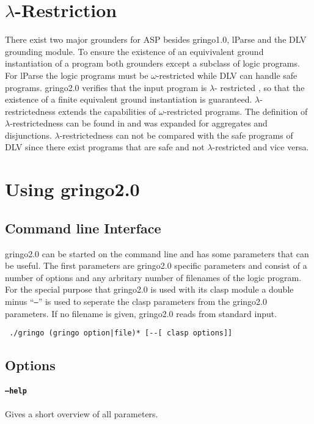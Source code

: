 \documentclass[a4paper,10pt]{article}
\begin{document}
\section{$\lambda$-Restriction}
\label{domainrestricted}
There exist two major grounders for ASP besides gringo1.0, lParse \cite{lparseManual} and  the DLV grounding module\cite{DLV}.
To ensure the existence of an equivivalent ground instantiation of a program both grounders except a subclass of logic programs. For lParse the logic programs must be $\omega$-restricted\cite{omega} while DLV can handle safe programs\cite{safe}.
gringo2.0 verifies that the input program is $\lambda$-
restricted \cite{gringopaper}, so that the existence of a finite equivalent ground instantiation is guaranteed. 
$\lambda$-restrictedness extends the capabilities of $\omega$-restricted programs. The definition of $\lambda$-restrictedness can be found in \cite{gringopaper} and was expanded for aggregates and disjunctions.
$\lambda$-restrictedness can not be compared with the safe programs of DLV since there exist programs that are safe and not $\lambda$-restricted and vice versa.


\section{Using gringo2.0}
\subsection{Command line Interface}
gringo2.0 can be started on the command line and has some parameters that can be useful.
The first parameters are gringo2.0 specific parameters and consist of a number of options and any arbritary number of filenames of the logic program. For the special purpose that gringo2.0 is used with its clasp module a double minus ``\texttt{--}'' is used to seperate the clasp parameters from the gringo2.0 parameters.
If no filename is given, gringo2.0 reads from standard input.
\begin{verbatim}
 ./gringo (gringo option|file)* [--[ clasp options]]
\end{verbatim}
\subsection{Options}

\paragraph{\texttt{--help}}
Gives a short overview of all parameters.
\end{document}
